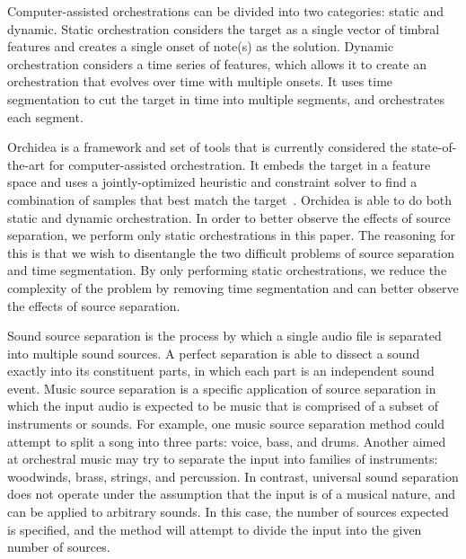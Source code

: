 \documentclass{article}
\begin{document}
  Computer-assisted orchestrations can be divided into two categories: static and dynamic. Static orchestration considers the target as a single vector of timbral features and creates a single onset of note(s) as the solution. Dynamic orchestration considers a time series of features, which allows it to create an orchestration that evolves over time with multiple onsets. It uses time segmentation to cut the target in time into multiple segments, and orchestrates each segment.
  
  Orchidea is a framework and set of tools that is currently considered the state-of-the-art for computer-assisted orchestration. It embeds the target in a feature space and uses a jointly-optimized heuristic and constraint solver to find a combination of samples that best match the target~\cite{Cella18, Cella2020}. Orchidea is able to do both static and dynamic orchestration. In order to better observe the effects of source separation, we perform only static orchestrations in this paper. The reasoning for this is that we wish to disentangle the two difficult problems of source separation and time segmentation. By only performing static orchestrations, we reduce the complexity of the problem by removing time segmentation and can better observe the effects of source separation. 

  Sound source separation is the process by which a single audio file is separated into multiple sound sources. A perfect separation is able to dissect a sound exactly into its constituent parts, in which each part is an independent sound event. Music source separation is a specific application of source separation in which the input audio is expected to be music that is comprised of a subset of instruments or sounds. For example, one music source separation method could attempt to split a song into three parts: voice, bass, and drums. Another aimed at orchestral music may try to separate the input into families of instruments: woodwinds, brass, strings, and percussion. In contrast, universal sound separation does not operate under the assumption that the input is of a musical nature, and can be applied to arbitrary sounds. In this case, the number of sources expected is specified, and the method will attempt to divide the input into the given number of sources.    
  
\end{document}
